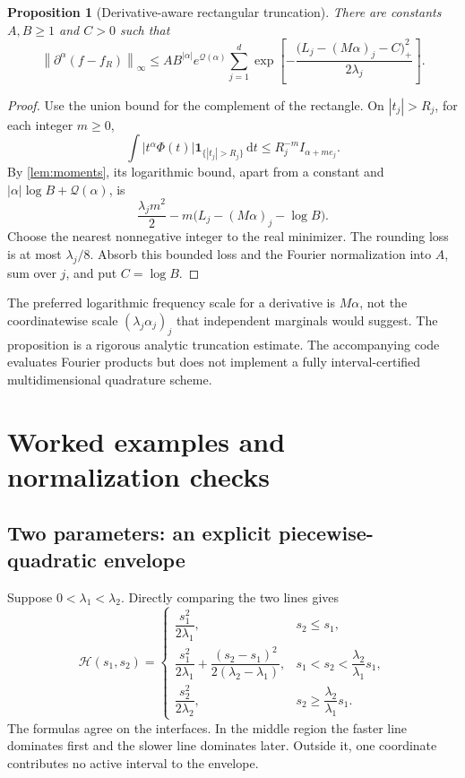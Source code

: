\documentclass[11pt,a4paper]{article}
\numberwithin{equation}{section}
\newtheorem{proposition}[theorem]{Proposition}
\theoremstyle{definition}
\theoremstyle{remark}\newtheorem{remark}[theorem]{Remark}
\newcommand{\dd}{\,\mathrm d}
\newcommand{\one}{\mathbf 1}
\newcommand{\He}{\mathcal H}
\newcommand{\Qf}{\mathcal Q}
\newcommand{\norm}[1]{\left\lVert #1\right\rVert}
\begin{document}
\begin{proposition}[Derivative-aware rectangular truncation]
\label{prop:truncation}
There are constants $A,B\ge1$ and $C>0$ such that
\begin{equation}
 \norm{\partial^\alpha(f-f_R)}_\infty
 \le AB^{|\alpha|}e^{\Qf(\alpha)}
 \sum_{j=1}^d
 \exp\left[-\frac{\bigl(L_j-(M\alpha)_j-C\bigr)_+^2}{2\lambda_j}\right].
 \label{eq:truncation}
\end{equation}
\end{proposition}
\begin{proof}
Use the union bound for the complement of the rectangle. On $|t_j|>R_j$,
for each integer $m\ge0$,
\[
 \int |t^\alpha\Phi(t)|\one_{\{|t_j|>R_j\}}\dd t
       \le R_j^{-m}I_{\alpha+me_j}.
\]
By \cref{lem:moments}, its logarithmic bound, apart from a constant and
$|\alpha|\log B+\Qf(\alpha)$, is
\[
 \frac{\lambda_jm^2}{2}
 -m\bigl(L_j-(M\alpha)_j-\log B\bigr).
\]
Choose the nearest nonnegative integer to the real minimizer. The rounding
loss is at most $\lambda_j/8$. Absorb this bounded loss and the Fourier
normalization into $A$, sum over $j$, and put $C=\log B$.
\end{proof}

The preferred logarithmic frequency scale for a derivative is $M\alpha$,
not the coordinatewise scale $(\lambda_j\alpha_j)_j$ that independent
marginals would suggest. The proposition is a rigorous analytic truncation
estimate. The accompanying code evaluates Fourier products but does not
implement a fully interval-certified multidimensional quadrature scheme.

\section{Worked examples and normalization checks}
\label{sec:examples}

\subsection{Two parameters: an explicit piecewise-quadratic envelope}

Suppose $0<\lambda_1<\lambda_2$. Directly comparing the two lines gives
\begin{equation}
 \He(s_1,s_2)=
 \begin{cases}
 \dfrac{s_1^2}{2\lambda_1},&s_2\le s_1,\\[2mm]
 \dfrac{s_1^2}{2\lambda_1}
 +\dfrac{(s_2-s_1)^2}{2(\lambda_2-\lambda_1)},
     &s_1<s_2<\dfrac{\lambda_2}{\lambda_1}s_1,\\[3mm]
 \dfrac{s_2^2}{2\lambda_2},&s_2\ge\dfrac{\lambda_2}{\lambda_1}s_1.
 \end{cases}
 \label{eq:H2}
\end{equation}
The formulas agree on the interfaces. In the middle region the faster
line dominates first and the slower line dominates later. Outside it, one
coordinate contributes no active interval to the envelope.
\end{document}
